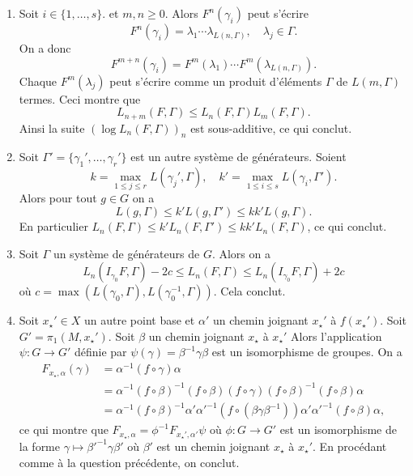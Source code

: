 \documentclass[a4paper,12pt,openany]{article}
\theoremstyle{plain}
\theoremstyle{definition}
\begin{document}
 \vspace{1.5mm} 

\begin{enumerate}
\item Soit $i \in \{1, \dots, s\}$. et $m,n \geqslant 0$. Alors $F^n(\gamma_i)$ peut s'\'ecrire 
$$
F^n(\gamma_i) = \lambda_1 \cdots \lambda_{L(n, \Gamma)}, \quad \lambda_j \in \Gamma.
$$
On a donc
$$
F^{m+n}(\gamma_i) = F^m(\lambda_1) \cdots F^m(\lambda_{L(n,\Gamma)}).
$$
Chaque $F^m(\lambda_j)$ peut s'\'ecrire comme un produit d'\'el\'ements $\Gamma$ de $L(m, \Gamma)$ termes. Ceci montre que
$$
L_{n+m}(F, \Gamma) \leqslant L_n(F, \Gamma)L_m(F, \Gamma).
$$
Ainsi la suite $(\log L_n(F,\Gamma))_n$ est sous-additive, ce qui conclut.


\item Soit $\Gamma' = \{\gamma_1', \dots, \gamma_r'\}$ est un autre syst\`eme de g\'en\'erateurs. Soient 
$$
k = \max_{1 \leqslant j \leqslant r} L(\gamma_j', \Gamma), \quad k' = \max_{1 \leqslant i \leqslant s} L(\gamma_i, \Gamma').
$$
Alors pour tout $g \in G$ on a 
$$
L(g, \Gamma) \leqslant k' L(g, \Gamma') \leqslant kk' L(g, \Gamma).
$$
En particulier $L_n(F, \Gamma) \leqslant k' L_n(F, \Gamma') \leqslant kk' L_n(F, \Gamma)$, ce qui conclut.

\item Soit $\Gamma$ un syst\`eme de g\'en\'erateurs de $G$. Alors on a
$$
L_n(I_{\gamma_0} F, \Gamma) -2c \leqslant  L_n(F, \Gamma) \leqslant L_n(I_{\gamma_0} F, \Gamma) + 2c
$$
o\`u $c = \max(L(\gamma_0, \Gamma), L(\gamma_0^{-1}, \Gamma)).$ Cela conclut.


\item Soit $x_\star' \in X$ un autre point base et $\alpha'$ un chemin joignant $x_\star'$ \`a $f(x_\star')$. Soit $G' = \pi_1(M, x_\star')$. Soit $\beta$ un chemin joignant $x_\star$ \`a $x_\star'$ Alors l'application $\psi : G \to G'$ d\'efinie par $\psi(\gamma) = \beta^{-1} \gamma \beta$ est un isomorphisme de groupes. On a
$$
\begin{aligned}
F_{x_\star, \alpha}(\gamma) &=  \alpha^{-1}(f \circ \gamma) \alpha \\
&= \alpha^{-1}(f \circ \beta)^{-1}(f \circ \beta) (f \circ \gamma) (f \circ \beta)^{-1}(f \circ \beta) \alpha \\
&= \alpha^{-1} (f \circ \beta)^{-1} \alpha' \alpha'^{-1}(f \circ (\beta \gamma \beta^{-1})) \alpha' \alpha'^{-1}(f \circ \beta) \alpha,
\end{aligned}
$$
ce qui montre que $F_{x_\star, \alpha} = \phi^{-1} F_{x_\star', \alpha'} \psi$ o\`u $\phi : G \to G'$ est un isomorphisme de la forme $\gamma \mapsto \beta'^{-1} \gamma \beta'$ o\`u $\beta'$ est un chemin joignant $x_\star$ \`a $x_\star'$. En proc\'edant comme \`a la question pr\'ec\'edente, on conclut.


\end{enumerate}
\end{document}
